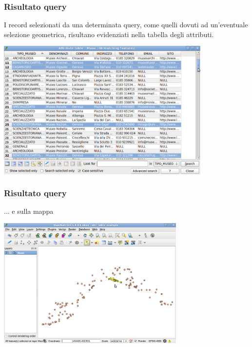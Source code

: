 \documentclass{beamer}
\begin{document}
{ \begin{frame}
   \frametitle{Risultato query}
   I record selezionati da una determinata query, come quelli dovuti ad un'eventuale selezione geometrica, risultano evidenziati nella tabella degli attributi.
		    \begin{center}
			\includegraphics[width=0.80\textwidth] {topology_attrmanagement_pics/attr_query.png}
		    \end{center}
\end{frame}

 \begin{frame}
   \frametitle{Risultato query}
   ... e sulla mappa
		    \begin{center}
			\includegraphics[width=0.70\textwidth] {topology_attrmanagement_pics/selected_qgis.png}
		    \end{center}
\end{frame}


}
\end{document}
